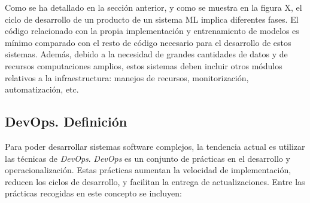 \documentclass[
  12pt,
  a4paperpaper,
]{report}
\begin{document}
Como se ha detallado en la sección anterior, y como se muestra en la
figura X, el ciclo de desarrollo de un producto de un sistema ML implica
diferentes fases. El código relacionado con la propia implementación y
entrenamiento de modelos es mínimo comparado con el resto de código
necesario para el desarrollo de estos sistemas. Además, debido a la
necesidad de grandes cantidades de datos y de recursos computaciones
amplios, estos sistemas deben incluir otros módulos relativos a la
infraestructura: manejos de recursos, monitorización, automatización,
etc.

\hypertarget{devops.-definiciuxf3n}{%
\subsection{DevOps. Definición}\label{devops.-definiciuxf3n}}

Para poder desarrollar sistemas software complejos, la tendencia actual
es utilizar las técnicas de \emph{DevOps}. \emph{DevOps} es un conjunto
de prácticas en el desarrollo y operacionalización. Estas prácticas
aumentan la velocidad de implementación, reducen los ciclos de
desarrollo, y facilitan la entrega de actualizaciones. Entre las
prácticas recogidas en este concepto se incluyen:
\end{document}
